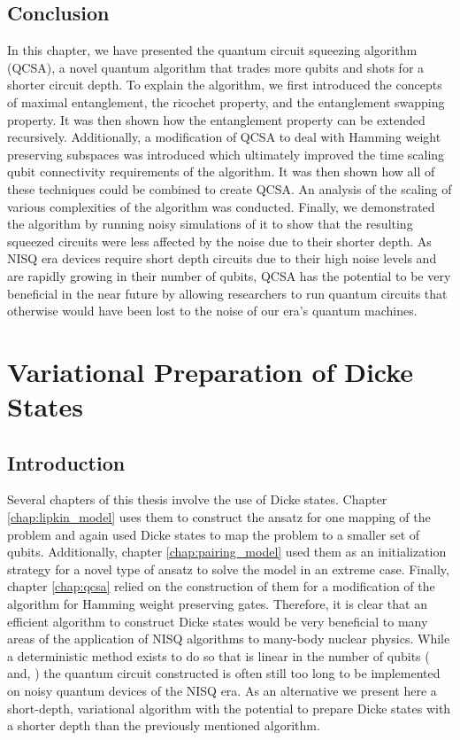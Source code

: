 \documentclass[Dual]{msu-thesis}
\begin{document}
\section{Conclusion}

In this chapter, we have presented the quantum circuit squeezing algorithm (QCSA), a novel quantum algorithm that trades more qubits and shots for a shorter circuit depth. To explain the algorithm, we first introduced the concepts of maximal entanglement, the ricochet property, and the entanglement swapping property. It was then shown how the entanglement property can be extended recursively. Additionally, a modification of QCSA to deal with Hamming weight preserving subspaces was introduced which ultimately improved the time scaling qubit connectivity requirements of the algorithm. It was then shown how all of these techniques could be combined to create QCSA. An analysis of the scaling of various complexities of the algorithm was conducted. Finally, we demonstrated the algorithm by running noisy simulations of it to show that the resulting squeezed circuits were less affected by the noise due to their shorter depth. As NISQ era devices require short depth circuits due to their high noise levels and are rapidly growing in their number of qubits, QCSA has the potential to be very beneficial in the near future by allowing researchers to run quantum circuits that otherwise would have been lost to the noise of our era's quantum machines.

\chapter{Variational Preparation of Dicke States}
\label{chap:vpds}

\section{Introduction}

Several chapters of this thesis involve the use of Dicke states. Chapter \ref{chap:lipkin_model} uses them to construct the ansatz for one mapping of the problem and again used Dicke states to map the problem to a smaller set of qubits. Additionally, chapter \ref{chap:pairing_model} used them as an initialization strategy for a novel type of ansatz to solve the model in an extreme case. Finally, chapter \ref{chap:qcsa} relied on the construction of them for a modification of the algorithm for Hamming weight preserving gates. Therefore, it is clear that an efficient algorithm to construct Dicke states would be very beneficial to many areas of the application of NISQ algorithms to many-body nuclear physics. While a deterministic method exists to do so that is linear in the number of qubits (\cite{ref:dicke_prep} and, \cite{ref:dicke_prep_dac}) the quantum circuit constructed is often still too long to be implemented on noisy quantum devices of the NISQ era. As an alternative we present here a short-depth, variational algorithm with the potential to prepare Dicke states with a shorter depth than the previously mentioned algorithm.
\end{document}
